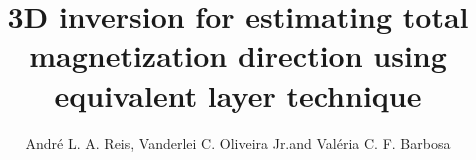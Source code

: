 \documentclass[manuscript,revised]{geophysics}
\begin{document}
\title{3D inversion for estimating total magnetization direction using equivalent layer technique}

\renewcommand{\thefootnote}{\fnsymbol{footnote}} 


\address{
\footnotemark[2] Observat\'orio Nacional, Rio de Janeiro, Brazil\\
\footnotemark[1] Corresponding author: decoluisreis@gmail.com}
\author{Andr\'e L. A. Reis\footnotemark[2] \footnotemark[1], Vanderlei C. Oliveira Jr.\footnotemark[2] and Val\'eria C. F. Barbosa \footnotemark[2]}


\maketitle



%



\newpage



\clearpage


\end{document}
